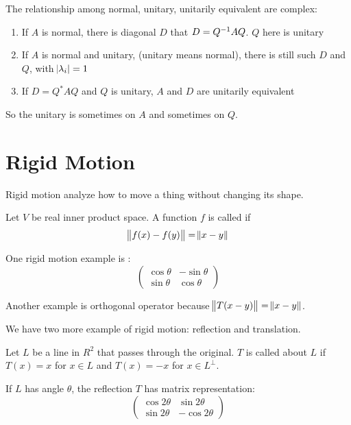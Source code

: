 The relationship among normal, unitary, unitarily equivalent are complex:
\begin{enumerate}
    \item If $A$ is normal, there is diagonal $D$ that $D = {Q}^{-1} A Q$. $Q$ here is unitary
    \item If $A$ is normal and unitary, (unitary means normal), there is still such $D$ and $Q$, with $\abs{\lambda_i} = 1$
    \item If $D = Q^* A Q$ and $Q$ is unitary, $A$ and $D$ are unitarily equivalent
\end{enumerate}

So the unitary is sometimes on $A$ and sometimes on $Q$.


\section{Rigid Motion}

Rigid motion analyze how to move a thing without changing its shape.

\begin{definition}
    Let $V$ be real inner product space. A function $f$ is called  if 
    \begin{equation}
        \norm{f(x) - f(y)} = \norm{x - y}
    \end{equation}
\end{definition}

One rigid motion example is :
\begin{equation}
    \begin{pmatrix}
        \cos \theta & - \sin \theta \\
        \sin \theta & \cos \theta
    \end{pmatrix}
\end{equation}

Another example is orthogonal operator because $\norm{T(x-y)} = \norm{x - y}$.


We have two more example of rigid motion: reflection and translation.

\begin{definition}[Reflection]
    Let $L$ be a line in $R^2$ that passes through the original. $T$ is called  about $L$ if $T(x) = x$ for $x \in L$ and $T(x) = -x$ for $x \in L^\perp$. 
    
    If $L$ has angle $\theta$, the reflection $T$ has matrix representation:
\begin{equation}
    \begin{pmatrix}
        \cos 2\theta & \sin 2\theta \\
        \sin 2\theta & -\cos 2\theta
    \end{pmatrix}
\end{equation}
\end{definition}

